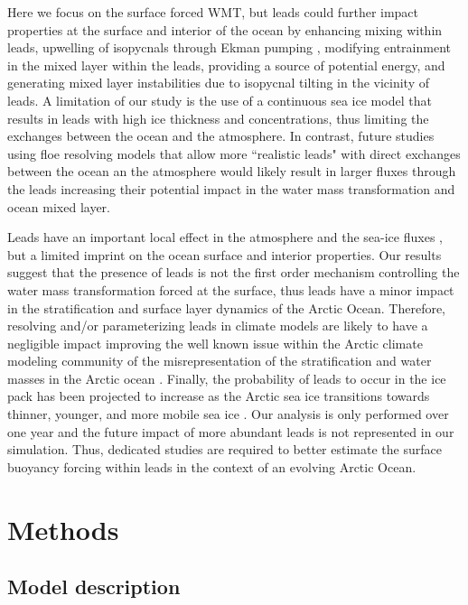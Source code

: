 \documentclass[lineno,sn-basic]{sn-jnl}%
\begin{document}
Here we focus on the surface forced WMT, but leads could further impact properties at the surface and interior of the ocean by enhancing mixing within leads, upwelling of isopycnals through Ekman pumping \citep{McPhee_LKF_2005}, modifying  entrainment in the mixed layer within the leads, providing a source of potential energy, and generating mixed layer instabilities due to isopycnal tilting in the vicinity of leads. A limitation of our study is the use of a continuous sea ice model that results in leads with high ice thickness and concentrations, thus limiting the exchanges between the ocean and the atmosphere. In contrast, future studies using floe resolving models that allow more ``realistic leads" with direct exchanges between the ocean an the atmosphere would likely result in larger fluxes through the leads increasing their potential impact in the water mass transformation and ocean mixed layer.

Leads have an important local effect in the atmosphere and the sea-ice fluxes \citep{Lupkes_leads_2008,Marcq_flux_lead_2012, Wettlaufer_insulator_1997, Smith_polynyas_1990}, but a limited imprint on the ocean surface and interior properties. Our results suggest that the presence of leads is not the first order mechanism controlling the water mass transformation forced at the surface, thus leads have a minor impact in the stratification and surface layer dynamics of the Arctic Ocean.
Therefore, resolving and/or parameterizing leads in climate models are likely to have a negligible impact improving the well known issue within the Arctic climate modeling community of the misrepresentation of the stratification and water masses in the Arctic ocean \citep{Wang_ompi_2024,Ilicak_core_2016}. Finally, the probability of leads to occur in the ice pack has been projected to increase as the Arctic sea ice transitions towards thinner, younger, and more mobile sea ice \citep{Boutin_rheology_2023, IPCC_arctic_2022}. Our analysis is only performed over one year and the future impact of more abundant leads is not represented in our simulation. Thus, dedicated studies are required to better estimate the surface buoyancy forcing within leads in the context of an evolving Arctic Ocean.  

\section{Methods}
\subsection*{Model description}
\end{document}
